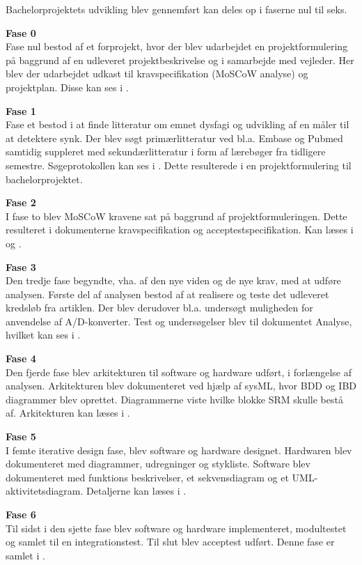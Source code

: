 Bachelorprojektets udvikling blev gennemført kan deles op i faserne nul til seks. 

\textbf{Fase 0}\\
Fase nul bestod af et forprojekt, hvor der blev udarbejdet en projektformulering på baggrund af en udleveret projektbeskrivelse og i samarbejde med vejleder. Her blev der udarbejdet udkast til kravspecifikation (MoSCoW analyse) og projektplan. Disse kan ses i .

\textbf{Fase 1}\\
Fase et bestod i at finde litteratur om emnet dysfagi og udvikling af en måler til at detektere synk. Der blev søgt primærlitteratur ved bl.a. Embase og Pubmed samtidig suppleret med sekundærlitteratur i form af lærebøger fra tidligere semestre. Søgeprotokollen kan ses i . Dette resulterede i en projektformulering til bachelorprojektet.

\textbf{Fase 2}\\
I fase to blev MoSCoW kravene sat på baggrund af projektformuleringen. Dette resulteret i dokumenterne kravspecifikation og acceptestspecifikation. Kan læses i  og .

\textbf{Fase 3}\\
Den tredje fase begyndte, vha. af den nye viden og de nye krav, med at udføre analysen. Første del af analysen bestod af at realisere og teste det udleveret kredsløb fra artiklen. Der blev derudover bl.a. undersøgt muligheden for anvendelse af A/D-konverter. Test og undersøgelser blev til dokumentet Analyse, hvilket kan ses i .

\textbf{Fase 4}\\
Den fjerde fase blev arkitekturen til software og hardware udført, i forlængelse af analysen. Arkitekturen blev dokumenteret ved hjælp af sysML, hvor BDD og IBD diagrammer blev oprettet. Diagrammerne viste hvilke blokke SRM skulle bestå af. Arkitekturen kan læses i .

\textbf{Fase 5}\\
I femte iterative design fase, blev software og hardware designet. Hardwaren blev dokumenteret med diagrammer, udregninger og stykliste. Software blev dokumenteret med funktions beskrivelser, et sekvensdiagram og et UML-aktivitetsdiagram. Detaljerne kan læses i .

\textbf{Fase 6}\\
Til sidst i den sjette fase blev software og hardware implementeret, modultestet og samlet til en integrationstest. Til slut blev acceptest udført. Denne fase er samlet i .

